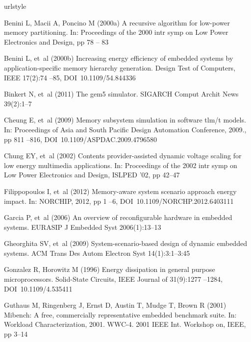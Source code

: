 \documentclass[smallextended]{svjour3}
\begin{document}
%
%
\begin{thebibliography}{40}
\providecommand{\natexlab}[1]{#1}
\providecommand{\url}[1]{{#1}}
\providecommand{\urlprefix}{URL }
\expandafter\ifx\csname urlstyle\endcsname\relax
  \providecommand{\doi}[1]{DOI~\discretionary{}{}{}#1}\else
  \providecommand{\doi}{DOI~\discretionary{}{}{}\begingroup
  \urlstyle{rm}\Url}\fi
\providecommand{\eprint}[2][]{\url{#2}}

Benini L, Macii A, Poncino M (2000{\natexlab{a}}) A recursive algorithm for
  low-power memory partitioning. In: Proceedings of the 2000 intr symp on Low
  Power Electronics and Design, pp 78 -- 83

Benini L, et~al (2000{\natexlab{b}}) Increasing energy efficiency of embedded
  systems by application-specific memory hierarchy generation. Design Test of
  Computers, IEEE 17(2):74 --85, \doi{10.1109/54.844336}

Binkert N, et~al (2011) The gem5 simulator. SIGARCH Comput Archit News
  39(2):1--7

Cheung E, et~al (2009) Memory subsystem simulation in software tlm/t models.
  In: Proceedings of Asia and South Pacific Design Automation Conference,
  2009., pp 811 --816, \doi{10.1109/ASPDAC.2009.4796580}

Chung EY, et~al (2002) Contents provider-assisted dynamic voltage scaling for
  low energy multimedia applications. In: Proceedings of the 2002 intr symp on
  Low Power Electronics and Design, ISLPED '02, pp 42--47

Filippopoulos I, et~al (2012) Memory-aware system scenario approach energy
  impact. In: NORCHIP, 2012, pp 1 --6, \doi{10.1109/NORCHP.2012.6403111}

Garcia P, et~al (2006) An overview of reconfigurable hardware in embedded
  systems. EURASIP J Embedded Syst 2006(1):13--13

Gheorghita SV, et~al (2009) System-scenario-based design of dynamic embedded
  systems. ACM Trans Des Autom Electron Syst 14(1):3:1--3:45

Gonzalez R, Horowitz M (1996) Energy dissipation in general purpose
  microprocessors. Solid-State Circuits, IEEE Journal of 31(9):1277 --1284,
  \doi{10.1109/4.535411}

Guthaus M, Ringenberg J, Ernst D, Austin T, Mudge T, Brown R (2001) Mibench: A
  free, commercially representative embedded benchmark suite. In: Workload
  Characterization, 2001. WWC-4. 2001 IEEE Int. Workshop on, IEEE, pp 3--14


\end{thebibliography}
\end{document}
